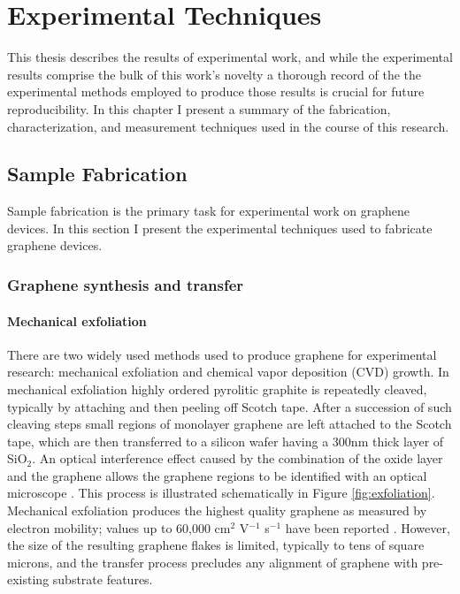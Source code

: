 \documentclass[edeposit,fullpage,draftthesis]{uiucthesis2009}
\begin{document}
\chapter{Experimental Techniques}

    This thesis describes the results of experimental work, and while the experimental results comprise the bulk
    of this work's novelty a thorough record of the the experimental methods employed to produce those results 
    is crucial for future reproducibility.
    In this chapter I present a summary of the fabrication, characterization, and measurement techniques used
    in the course of this research.
    
    \section{Sample Fabrication}
    
        Sample fabrication is the primary task for experimental work on graphene devices. 
        In this section I present the experimental techniques used to fabricate graphene devices.
    
        \subsection{Graphene synthesis and transfer}
        
        
            \subsubsection{Mechanical exfoliation}
            
            There are two widely used methods used to produce graphene for 
        experimental research: mechanical exfoliation\cite{novoselov2004electric} and chemical vapor
        deposition (CVD) growth\cite{li2009large}. In mechanical exfoliation highly ordered
        pyrolitic graphite is repeatedly cleaved, typically by attaching and 
        then peeling off Scotch tape. After a succession of such cleaving steps
        small regions of monolayer graphene are left attached to the Scotch
        tape, which are then transferred to a silicon wafer having a 300nm
        thick layer of SiO$_2$. An optical interference effect caused by the 
        combination of the oxide layer and the graphene allows the graphene
        regions to be identified with an optical microscope \cite{Blake2007}.
        This process is illustrated schematically in Figure \ref{fig:exfoliation}.
        Mechanical exfoliation produces the highest quality graphene as
        measured by electron mobility; values up to 60,000 cm$^2$ V$^{-1}$
        s$^{-1}$ have been reported \cite{Dean2010}. However, the size of the 
        resulting graphene flakes is limited, typically to tens of square
        microns, and the transfer process precludes any alignment of graphene
        with pre-existing substrate features.
        
\end{document}
